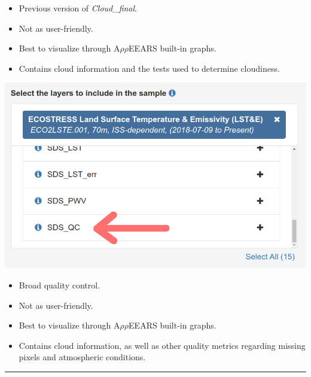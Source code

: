 \documentclass[oneside,a4paper,11pt,explicit]{book}
\begin{document}
\begin{tcbraster}[raster columns=3, raster equal height, raster column skip=-.5mm]
\begin{tcolorbox}[colback=yellow!5!white,colframe=IceCreamLeaf, colbacktitle=IceCreamLeaf,title=SDS\_CloudMask]
\begin{center}
			\end{center}
			\begin{itemize}[leftmargin=*]
				\item Previous version of \textit{Cloud\_final}.
				\item Not as user-friendly.
				\item Best to visualize through A$\rho\rho$EEARS built-in graphs.
				\item Contains cloud information and the tests used to determine cloudiness.
			\end{itemize}
		\end{tcolorbox}
		\begin{tcolorbox}[colback=yellow!5!white,colframe=IceCreamLeaf,
			colbacktitle=IceCreamLeaf,title=SDS\_QC]
			\begin{center}
				\includegraphics[width=\columnwidth]{SDS_QC.png}
			\end{center}
			\begin{itemize}[leftmargin=*]
				\item Broad quality control.
				\item Not as user-friendly.
				\item Best to visualize through A$\rho\rho$EEARS built-in graphs.
				\item Contains cloud information, as well as other quality metrics regarding missing pixels and atmospheric conditions.
			\end{itemize}
		\end{tcolorbox}
	\end{tcbraster}
	
	\vspace{.25em}
	
	\hrule
	
	\vspace*{.75em}
	
\end{document}

